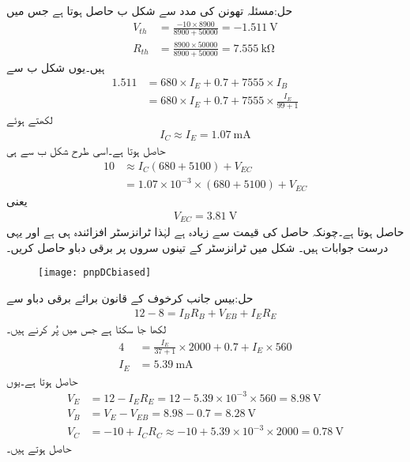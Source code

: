 حل:مسئلہ تھونن کی مدد سے شکل  ب حاصل ہوتا ہے جس میں
\begin{align*}
V_{th}&=\frac{-10 \times 8900}{8900+50000}=\SI{-1.511}{\volt}\\
R_{th}&=\frac{8900 \times 50000}{8900+50000}=\SI{7.555}{\kilo \ohm}
\end{align*}
ہیں۔یوں شکل  ب سے
\begin{align*}
1.511 &=680 \times I_E+0.7+7555 \times I_B\\
&=680 \times I_E+0.7+7555 \times \frac{I_E}{99+1}
\end{align*}
لکھتے ہوئے
\begin{align*}
I_C \approx I_E=\SI{1.07}{\milli \ampere}
\end{align*}
حاصل ہوتا ہے۔اسی طرح شکل  ب سے ہی 
\begin{align*}
10& \approx I_C \left(680 +5100\right)+V_{EC} \\
&=1.07 \times 10^{-3} \times \left(680 +5100\right)+V_{EC}
\end{align*}
یعنی
\begin{align*}
V_{EC}=\SI{3.81}{\volt}
\end{align*}
حاصل ہوتا ہے۔چونکہ حاصل  کی قیمت  سے زیادہ ہے لہٰذا ٹرانزسٹر افزائندہ ہی ہے اور یہی درست جوابات ہیں۔
شکل  میں ٹرانزسٹر کے تینوں سروں پر برقی دباو حاصل کریں۔
\begin{figure}
\centering
\texttt{[image: pnpDCbiased]}
\caption{}
\label{شکل_ٹرانزسٹر_یکسمتی_مائل_جمع_منفی_جمع}
\end{figure}

حل:بیس جانب کرخوف کے قانون برائے برقی دباو سے
\begin{align*}
12-8=I_B R_B + V_{EB}+I_E R_E
\end{align*}
لکھا جا سکتا ہے جس میں  پُر کرنے ہیں۔
\begin{align*}
4&=\frac{I_E}{37+1} \times 2000+0.7 +I_E \times 560\\
I_E&=\SI{5.39}{\milli \ampere}
\end{align*}
حاصل ہوتا ہے۔یوں
\begin{align*}
V_E&=12-I_E R_E=12-5.39 \times 10^{-3} \times 560=\SI{8.98}{\volt}\\
V_B&=V_E-V_{EB}=8.98-0.7=\SI{8.28}{\volt}\\
V_C&=-10+I_C R_C \approx -10 +5.39 \times 10^{-3} \times 2000=\SI{0.78}{\volt}
\end{align*}
حاصل ہوتے ہیں۔

